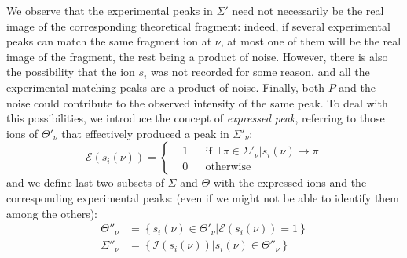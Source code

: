 We observe that  the experimental peaks in  $\Sigma'$ need not necessarily be
the real image of the corresponding theoretical fragment:
indeed, if several experimental peaks can match the same fragment ion at $\nu$,
at most one of them will be  the real image of the fragment, the rest being a
product of noise. However,
there is also  the possibility that the ion $s_i$ was not recorded for some
reason, and all the experimental
matching  peaks  are a product of noise. Finally,   both $P$ and the noise could
contribute to the observed intensity of the same peak.
To deal with this possibilities, we introduce the concept of \emph{expressed peak}, referring to 
those ions of $\Theta'_\nu$ that effectively
produced a peak in $\Sigma'_\nu$:
\begin{equation}
\mathcal E(s_i(\nu))=
\left\{
\begin{aligned}
&1&&\textrm{if}\ \exists\ \pi\in\Sigma'_\nu|s_i(\nu)\to\pi\\
&0&&\textrm{otherwise}
\end{aligned}
\right.
\end{equation}
and we define last two subsets of
$\Sigma$ and $\Theta$ with the expressed ions and the corresponding experimental
peaks:  (even if we might not be able to identify them among the others):
\begin{align}
\Theta''_\nu %
&=
\left\{
s_i(\nu) \in \Theta'_\nu | \mathcal E(s_i(\nu))=1\right\}\\
\Sigma''_\nu&=
\left\{
\mathcal I(s_i(\nu)) | s_i(\nu)\in\Theta''_\nu
\right\}
\end{align}




